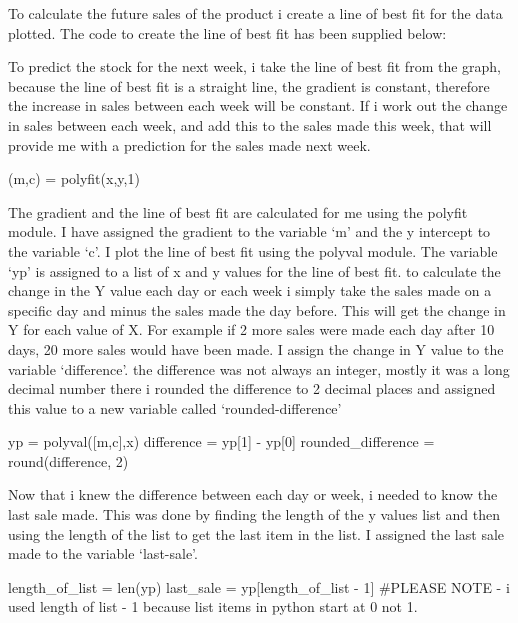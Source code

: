 To calculate the future sales of the product i create a line of best fit for the data plotted. The code to create the line of best fit has been supplied below:


To predict the stock for the next week, i take the line of best fit from the graph, because the line of best fit is  a straight line, the gradient is constant, therefore the increase in sales between each week will be constant. If i work out the change in sales between each week, and add this to the sales made this week, that will provide me with a prediction for the sales made next week. 

\begin{python}
(m,c) = polyfit(x,y,1)
\end{python}

The gradient and the line of best fit are calculated for me using the polyfit module. I have assigned the gradient to the variable `m' and the y intercept to the variable `c'. I plot the line of best fit using the polyval module. The variable `yp' is assigned to a list of x and y values for the line of best fit. to calculate the change in the Y value each day or each week i simply take the sales made on a specific day and minus the sales made the day before. This will get the change in Y for each value of X. For example if 2 more sales were made each day after 10 days, 20 more sales would have been made. I assign the change in Y value to the variable `difference'. the difference was not always an integer, mostly it was a long decimal number there i rounded the difference to 2 decimal places and assigned this value to a new variable called `rounded-difference'

\begin{python}
yp = polyval([m,c],x)
difference = yp[1] - yp[0]
rounded_difference = round(difference, 2)
\end{python}

Now that i knew the difference between each day or week, i needed to know the last sale made. This was done by finding the length of the y values list and then using the length of the list to get the last item in the list. I assigned the last sale made to the variable `last-sale'.

\begin{python}
length_of_list = len(yp)
last_sale = yp[length_of_list - 1]
#PLEASE NOTE - i used length of list - 1 because list items in python start at 0 not 1.
\end{python}

